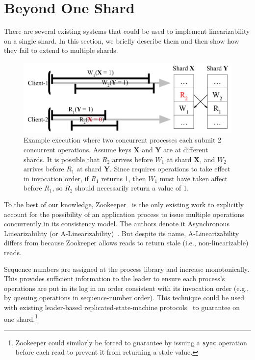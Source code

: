 \section{\MDL{} Beyond One Shard}
\label{sec:mdl:zookeeper}

There are several existing systems that could be used to implement
\multidispatch{} linearizability on a single shard. In this section,
we briefly describe them and then show how they fail to extend to
multiple shards.

\begin{figure}[!tb]
    \includegraphics[scale=.45]{figs/somet.png}
    \caption{Example execution where two concurrent processes each submit 2 concurrent operations. Assume keys \textbf{X} and \textbf{Y} are at different shards. It is possible that $R_2$ arrives before $W_1$ at shard \textbf{X}, and $W_2$ arrives before $R_1$ at shard \textbf{Y}. Since \MDL{} requires operations to take effect in invocation order, if $R_1$ returns 1, then $W_1$ must have taken affect before $R_1$, so $R_2$ should necessarily return a value of 1.}
    \label{fig:concurrentbatches}
\end{figure}

To the best of our knowledge, Zookeeper~\cite{hunt2010zookeeper} is the
only existing work to explicitly account for the possibility of an 
application process to issue multiple operations concurrently in its
consistency model. The authors denote it Asynchronous Linearizability
(or A-Linearizability)~\cite{hunt2010zookeeper}. But despite its name,
A-Linearizability differs from \MDL{} because Zookeeper allows
reads to return stale (i.e., non-linearizable) reads.

 Sequence numbers are assigned at the process 
library and increase monotonically. This provides sufficient information to 
the leader to ensure each process's operations are put in its log in an
order consistent with its invocation order
(e.g., by queuing operations in sequence-number order).
This technique could be used with existing leader-based replicated-state-machine
protocols~\cite{ongaro2014raft,lamport1998paxos,oki1988vr} to guarantee
\MDL{} on one shard.\footnote{Zookeeper could similarly be forced to
guarantee \MDL{} by issuing a \texttt{sync} operation before each read to prevent it from returning a stale value.}

